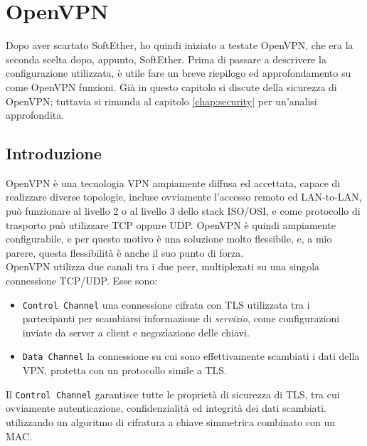 \section{OpenVPN}
Dopo aver scartato SoftEther, ho quindi iniziato a testate OpenVPN, che era la
seconda scelta dopo, appunto, SoftEther. Prima di passare a descrivere la configurazione
utilizzata, è utile fare un breve riepilogo ed approfondamento su come OpenVPN
funzioni. Già in questo capitolo si discute della sicurezza di OpenVPN; tuttavia
si rimanda al capitolo \ref{chap:security} per un'analisi approfondita.

\subsection{Introduzione}
OpenVPN è una tecnologia VPN ampiamente diffusa ed accettata, capace di realizzare
diverse topologie, incluse ovviamente l'accesso remoto ed LAN-to-LAN, può funzionare
al livello 2 o al livello 3 dello stack ISO/OSI, e come protocollo di trasporto
può utilizzare TCP oppure UDP. OpenVPN è quindi ampiamente configurabile, e per questo
motivo è una soluzione molto flessibile, e, a mio parere, questa flessibilità è anche
il suo punto di forza.\\
OpenVPN utilizza due canali tra i due peer, multiplexati su una singola connessione
TCP/UDP. Esse sono:
\begin{itemize}
  \item \texttt{Control Channel} una connessione cifrata con TLS utilizzata tra i
  partecipanti per scambiarsi informazione di \textit{servizio}, come configurazioni
  inviate da server a client e negoziazione delle chiavi.
  \item \texttt{Data Channel} la connessione su cui sono effettivamente scambiati
  i dati della VPN, protetta con un protocollo simile a TLS.
\end{itemize}
Il \texttt{Control Channel} garantisce tutte le proprietà di sicurezza di TLS,
tra cui ovviamente autenticazione, confidenzialità ed integrità
dei dati scambiati.
 utilizzando un algoritmo di cifratura a chiave simmetrica combinato
con un MAC.

